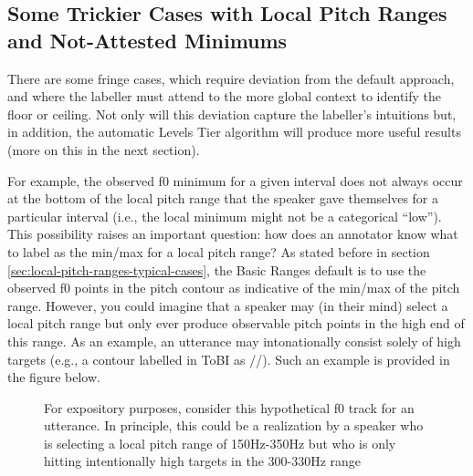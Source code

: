 \documentclass[11pt, twoside]{memoir}
\def\textlabel#1{{\relsize{-.5}\fontspec[Mapping=tex-text]{Roboto Mono}{#1}}}
\begin{document}
\subsection{Some Trickier Cases with Local Pitch Ranges and Not-Attested Minimums}\label{sec:some-trickier-cases-with-local-pitch-ranges}

There are some fringe cases, which require deviation from the default approach, and where the labeller must attend to the more global context to identify the floor or ceiling. Not only will this deviation capture the labeller’s intuitions but, in addition, the automatic Levels Tier algorithm will produce more useful results (more on this in the next section).

For example, the observed f0 minimum for a given interval does not always occur at the bottom of the local pitch range that the speaker gave themselves for a particular interval (i.e., the local minimum might not be a categorical “low”). This possibility raises an important question: how does an annotator know what to label as the min\slash max for a local pitch range? As stated before in section \ref{sec:local-pitch-ranges-typical-cases}, the Basic Ranges default is to use the observed f0 points in the pitch contour as indicative of the min\slash max of the pitch range. However, you could imagine that a speaker may (in their mind) select a local pitch range but only ever produce observable pitch points in the high end of this range. As an example, an utterance may intonationally consist solely of high targets (e.g., a contour labelled in ToBI as /\textlabel{H* H* H-H\%}/). Such an example is provided in the figure below.

\begin{figure}[H]
\centering
{}
\caption{For expository purposes, consider this hypothetical f0 track for an utterance. In principle, this could be a realization by a speaker who is selecting a local pitch range of 150Hz-350Hz but who is only hitting intentionally high targets in the 300-330Hz range%
\label{fig:ranges-what-if3 Ranges Adv}%
}
\end{figure}
\end{document}
